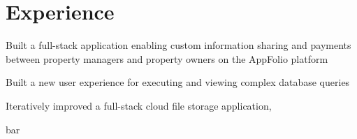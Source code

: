 \section{Experience}

\begin{tightemize}
\item Built a full-stack application enabling custom information sharing and payments between property managers and property owners on the AppFolio platform
\item Built a new user experience for executing and viewing complex database queries
\end{tightemize}
\sectionsep

\begin{tightemize}
\item Iteratively improved a full-stack cloud file storage application,
\item bar
\end{tightemize}
\sectionsep
